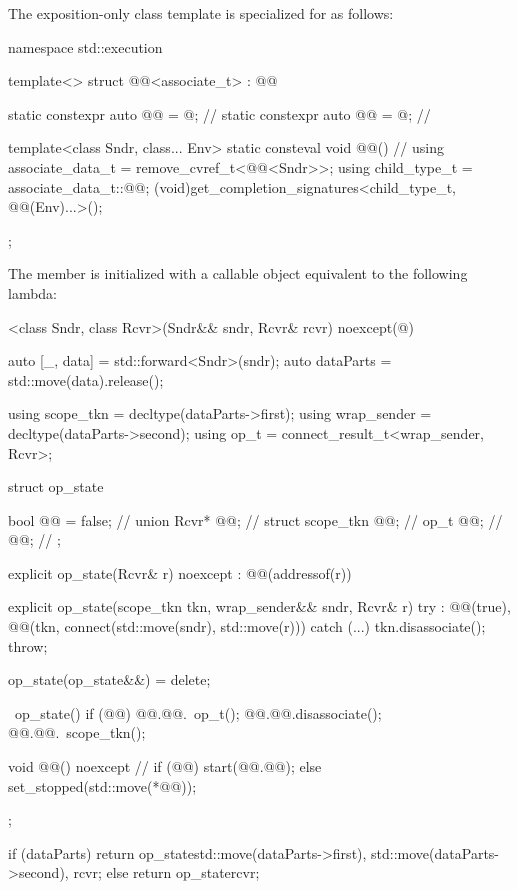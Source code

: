 \pnum
The exposition-only class template 
is specialized for  as follows:
%
\begin{codeblock}
namespace std::execution {
  template<>
  struct @@<associate_t> : @@ {
    static constexpr auto @@ = @\seebelow@;                // \expos
    static constexpr auto @@ = @\seebelow@;                    // \expos

    template<class Sndr, class... Env>
      static consteval void @@() {                     // \expos
        using associate_data_t = remove_cvref_t<@@<Sndr>>;
        using child_type_t = associate_data_t::@@;
        (void)get_completion_signatures<child_type_t, @@(Env)...>();
    }
  };
}
\end{codeblock}

\pnum
The member 
is initialized with a callable object equivalent to the following lambda:

\begin{codeblock}
[]<class Sndr, class Rcvr>(Sndr&& sndr, Rcvr& rcvr) noexcept(@\seebelow@) {
  auto [_, data] = std::forward<Sndr>(sndr);
  auto dataParts = std::move(data).release();

  using scope_tkn = decltype(dataParts->first);
  using wrap_sender = decltype(dataParts->second);
  using op_t = connect_result_t<wrap_sender, Rcvr>;

  struct op_state {
    bool @@ = false;    // \expos
    union {
      Rcvr* @@;               // \expos
      struct {
        scope_tkn @@;        // \expos
        op_t @@;                // \expos
      } @@;                  // \expos
    };

    explicit op_state(Rcvr& r) noexcept
      : @@(addressof(r)) {}

    explicit op_state(scope_tkn tkn, wrap_sender&& sndr, Rcvr& r) try
      : @@(true),
        @@(tkn, connect(std::move(sndr), std::move(r))) {
    }
    catch (...) {
      tkn.disassociate();
      throw;
    }

    op_state(op_state&&) = delete;

    ~op_state() {
      if (@@) {
        @@.@@.~op_t();
        @@.@@.disassociate();
        @@.@@.~scope_tkn();
      }
    }

    void @@() noexcept {       // \expos
      if (@@)
        start(@@.@@);
      else
        set_stopped(std::move(*@@));
    }
  };

  if (dataParts)
    return op_state{std::move(dataParts->first), std::move(dataParts->second), rcvr};
  else
    return op_state{rcvr};
}
\end{codeblock}

